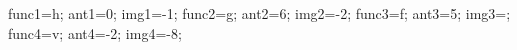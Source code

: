 \documentclass[exercice]{thedocument}%
\begin{document}
%
    \>func1=h;%
    \>ant1=0;%
    \>img1=-1;%
    \>func2=g;%
    \>ant2=6;%
    \>img2=-2;%
    \>func3=f;%
    \>ant3=5;%
    \>img3=;%
    \>func4=v;%
    \>ant4=-2;%
    \>img4=-8;%
\end{document}
